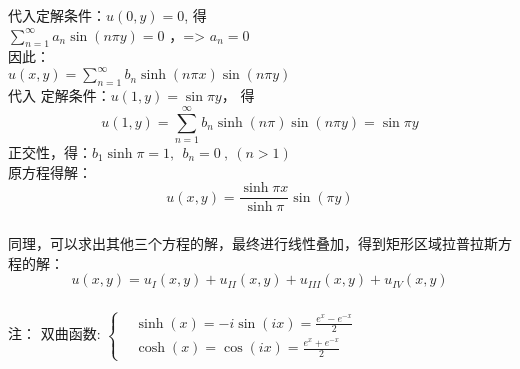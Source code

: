 \begin{frame}
	\frametitle{}	
	代入定解条件：$ u(0,y)=0$, 得 \\
	$ \sum\limits_{n=1}^{\infty }  a_n  \sin (n \pi y) =0 $ ，=> $ a_n=0$ \\
	因此：\\
	$	u(x,y)    = \sum\limits_{n=1}^{\infty }  b_n \sinh (n\pi x )  \sin (n \pi y)  $ \\ 
	代入 定解条件：$u(1,y) = \sin \pi y $， 得
	\begin{equation*}
		u(1,y)    = \sum\limits_{n=1}^{\infty }  b_n \sinh (n\pi )  \sin (n \pi y)  = \sin \pi y
	\end{equation*}
	正交性，得：$ b_1\sinh\pi =1,~~ b_n=0~,~ (n>1)$	\\ 
	原方程得解：
	\begin{equation*}
		u(x,y)    = \dfrac{\sinh \pi x}{\sinh \pi}  \sin ( \pi y) 
	\end{equation*}	
\end{frame}	

\begin{frame}
	\frametitle{}	
	同理，可以求出其他三个方程的解，最终进行线性叠加，得到矩形区域拉普拉斯方程的解：
	\begin{equation*}
		u(x,y)    = u_I (x,y)  +   u_{II}(x,y)  + u_{III}(x,y)  + u_{IV}(x,y)  
	\end{equation*}	
\end{frame}	

\begin{frame}
	\frametitle{}	
	\begin{block}	{注： 双曲函数:}		
		$\displaystyle \begin{cases}
			&\sinh(x) = -i \sin(ix) = \frac{e^x -e^{-x}}{2} \\
			&\cosh(x) = \cos(ix) = \frac{e^x +e^{-x}}{2} 
		\end{cases}$ 
	\end{block}
	\begin{center}
	\end{center}
\end{frame}	

